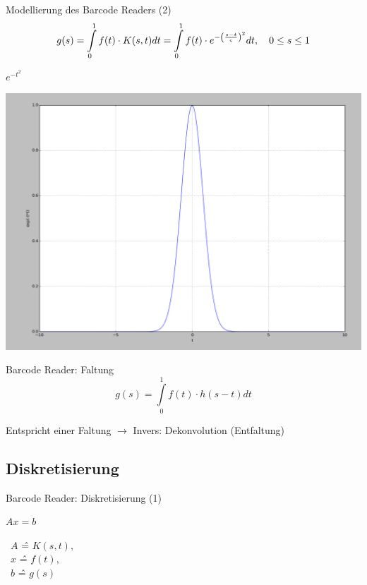 \documentclass[11pt]{beamer}
\begin{document}
\begin{frame}{Modellierung des Barcode Readers (2)}
\[g(s) = \int\limits_{0}^1 f(t) \cdot K(s,t) dt = \int\limits_{0}^1 f(t) \cdot e^{-\left(s-t \over \varsigma\right)^2} dt, \, \, \, \, \, \, 0 \leq s \leq 1 \]
\end{frame}


\begin{frame}{$e^{-t^2}$}
\begin{center}
\includegraphics[scale=0.25]{psf_one} 
\end{center}
\end{frame}


\begin{frame}{Barcode Reader: Faltung}
\[
g(s) = \int\limits_{0}^1 f(t) \cdot h(s-t) dt
\]

Entspricht einer Faltung $\rightarrow$ Invers: Dekonvolution (Entfaltung)
\end{frame}


\subsection{Diskretisierung}
\begin{frame}{Barcode Reader: Diskretisierung (1)}

\begin{center}
$Ax = b$\\

\mbox{}
\mbox{}
\mbox{}

\,\,\,$A$ \^= $K(s,t),$\\
\,\,\,$x$ \^= $f(t),$\\
\,\,\,$b$ \^= $g(s)$
\end{center}


\end{frame}
\end{document}
